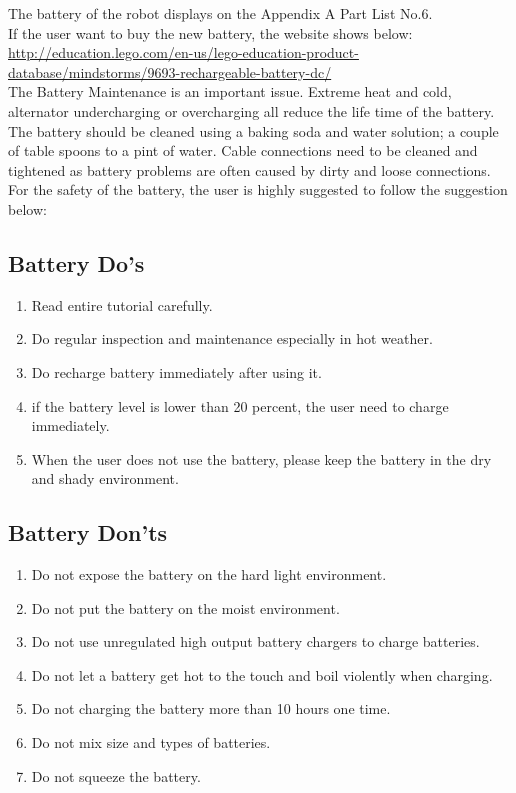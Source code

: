\documentclass[11pt, a4paper]{report}
\begin{document}
The battery of the robot displays on the Appendix A Part List No.6.\\
If the user want to buy the new battery, the website shows below:\\
\url{http://education.lego.com/en-us/lego-education-product-database/mindstorms/9693-rechargeable-battery-dc/}\\ 
The Battery Maintenance is an important issue. Extreme heat and cold, alternator undercharging or overcharging all reduce the life time of the battery. The battery should be cleaned using a baking soda and water solution; a couple of table spoons to a pint of water. Cable connections need to be cleaned and tightened as battery problems are often caused by dirty and loose connections. \\ 
For the safety of the battery, the user is highly suggested to follow the suggestion below:
\subsection{Battery Do's}
\begin{enumerate}
\item Read entire tutorial carefully.
\item Do regular inspection and maintenance especially in hot weather.
\item Do recharge battery immediately after using it. 
\item if the battery level is lower than 20 percent, the user need to charge immediately.
\item When the user does not use the battery, please keep the battery in the dry and shady environment.
\end{enumerate}
\subsection{Battery Don'ts}
\begin{enumerate}
\item Do not expose the battery on the hard light environment.
\item Do not put the battery on the moist environment.
\item Do not use unregulated high output battery chargers to charge batteries.
\item Do not let a battery get hot to the touch and boil violently when charging.
\item Do not charging the battery more than 10 hours one time.
\item Do not mix size and types of batteries.
\item Do not squeeze the battery.
\end{enumerate}
\end{document}
